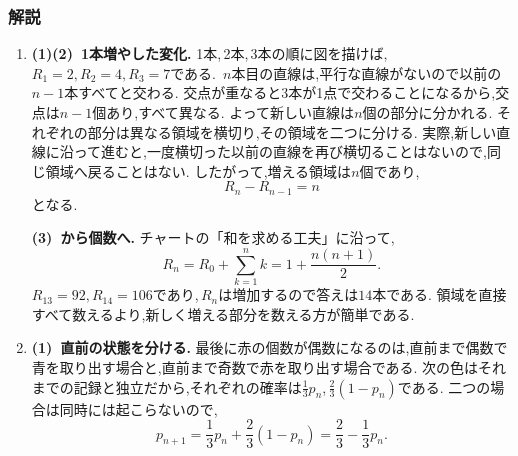       \subsubsection{解説}\label{節：発展入門：解法}
        \begin{enumerate}[label=\textbf{問\arabic*.},leftmargin=3.8em,format=\bookitemlink{practice-bridge}{solution}{problem}]
          \item \textbf{(1)(2)~1本増やした変化.}
                1本,\,2本,\,3本の順に図を描けば,\,$\displaystyle R_1=2,R_2=4,R_3=7$である.\,
                $\displaystyle n$本目の直線は,平行な直線がないので以前の$\displaystyle n-1$本すべてと交わる.
                交点が重なると3本が1点で交わることになるから,交点は$\displaystyle n-1$個あり,すべて異なる.
                よって新しい直線は$\displaystyle n$個の部分に分かれる.
                それぞれの部分は異なる領域を横切り,その領域を二つに分ける.
                実際,新しい直線に沿って進むと,一度横切った以前の直線を再び横切ることはないので,同じ領域へ戻ることはない.
                したがって,増える領域は$\displaystyle n$個であり,
                \[
                  R_n-R_{n-1}=n
                \]
                となる.

                \smallskip
                \textbf{(3)~から個数へ.}
                チャートの「和を求める工夫」に沿って,
                \[
                  R_n=R_0+\sum_{k=1}^{n}k
                     =1+\frac{n(n+1)}2.
                \]
                $\displaystyle R_{13}=92,R_{14}=106$であり,\,$\displaystyle R_n$は増加するので答えは$\displaystyle 14$本である.
                領域を直接すべて数えるより,新しく増える部分を数える方が簡単である.
          \item \textbf{(1)~直前の状態を分ける.}
                最後に赤の個数が偶数になるのは,直前まで偶数で青を取り出す場合と,直前まで奇数で赤を取り出す場合である.
                次の色はそれまでの記録と独立だから,それぞれの確率は$\displaystyle \frac13p_n$,\,$\displaystyle \frac23(1-p_n)$である.
                二つの場合は同時には起こらないので,
                \[
                  p_{n+1}=\frac13p_n+\frac23(1-p_n)
                         =\frac23-\frac13p_n.
                \]


\end{enumerate}
